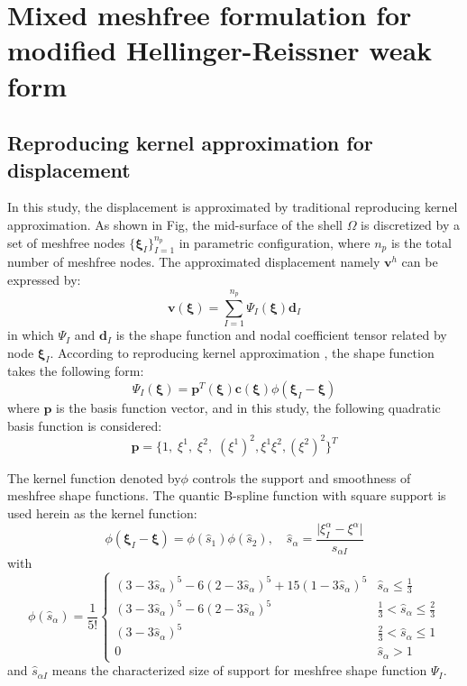 \section{Mixed meshfree formulation for modified Hellinger-Reissner weak form}\label{mixed}
\subsection{Reproducing kernel approximation for displacement}
In this study, the displacement is approximated by traditional reproducing kernel approximation. As shown in Fig, the mid-surface of the shell $\Omega$ is discretized by a set of meshfree nodes $\{\boldsymbol \xi_I\}_{I=1}^{n_p}$ in parametric configuration, where $n_p$ is the total number of meshfree nodes. The approximated displacement namely $\boldsymbol v^h$ can be expressed by:
\begin{equation}\label{approxv}
\boldsymbol v(\boldsymbol \xi) = \sum_{I=1}^{n_p} \Psi_I(\boldsymbol \xi) \boldsymbol d_I
\end{equation}
in which $\Psi_I$ and $\boldsymbol d_I$ is the shape function and nodal coefficient tensor related by node $\boldsymbol \xi_I$. According to reproducing kernel approximation \cite{liu1995}, the shape function takes the following form:
\begin{equation}
\Psi_I(\boldsymbol \xi) = \boldsymbol p^T(\boldsymbol \xi) \boldsymbol c(\boldsymbol \xi) \phi(\boldsymbol \xi_I - \boldsymbol \xi)
\end{equation}
where $\boldsymbol p$ is the basis function vector, and in this study, the following quadratic basis function is considered:
\begin{equation}
        \boldsymbol p = \{1,\;\xi^1,\;\xi^2,\;(\xi^1)^2,\xi^1\xi^2,(\xi^2)^2\}^T
\end{equation}

The kernel function denoted by$\phi$ controls the support and smoothness of meshfree shape functions. The quantic B-spline function with square support is used herein as the kernel function:
\begin{equation}
\phi(\boldsymbol \xi_I - \boldsymbol \xi) = \phi(\hat s_1)\phi(\hat s_2), \quad \hat s_\alpha = \frac{\vert \xi^\alpha_I - \xi^\alpha\vert}{s_{\alpha I}}
\end{equation}
with
\begin{equation}
\phi(\hat s_\alpha) = \frac{1}{5!}\begin{cases}
(3-3\hat s_\alpha)^5 - 6(2-3\hat s_\alpha)^5 + 15(1-3\hat s_\alpha)^5 & \hat s_\alpha \le \frac{1}{3} \\
(3-3\hat s_\alpha)^5 - 6(2-3\hat s_\alpha)^5 & \frac{1}{3}<\hat s_\alpha \le \frac{2}{3} \\
(3-3\hat s_\alpha)^5 & \frac{2}{3}<\hat s_\alpha \le 1 \\
0 & \hat s_\alpha >1
\end{cases}
\end{equation}
and $\hat s_{\alpha I}$ means the characterized size of support for meshfree shape function $\Psi_I$.

